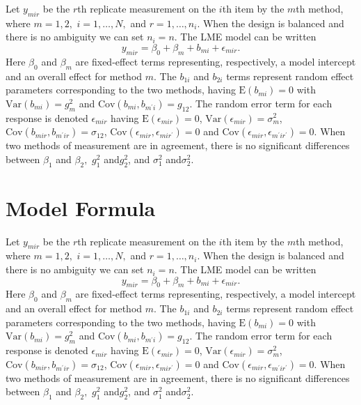 \documentclass[12pt, a4paper]{report}
\theoremstyle{plain}
\theoremstyle{definition}
\theoremstyle{remark}
\begin{document}
Let $y_{mir} $ be the $r$th replicate measurement on the $i$th item by the $m$th method, where $m=1,2,$ $i=1,\ldots,N,$ and $r = 1,\ldots,n_i.$ When the design is balanced and there is no ambiguity we can set $n_i=n.$ The LME model can be written
\begin{equation}
y_{mir} = \beta_{0} + \beta_{m} + b_{mi} + \epsilon_{mir}.
\end{equation}
Here $\beta_0$ and $\beta_m$ are fixed-effect terms representing, respectively, a model intercept and an overall effect for method $m.$ The $b_{1i}$ and $b_{2i}$ terms represent random effect parameters corresponding to the two methods, having $\mathrm{E}(b_{mi})=0$ with $\mathrm{Var}(b_{mi})=g^2_m$ and $\mathrm{Cov}(b_{mi}, b_{m^\prime i})=g_{12}.$ The random error term for each response is denoted $\epsilon_{mir}$ having $\mathrm{E}(\epsilon_{mir})=0$, $\mathrm{Var}(\epsilon_{mir})=\sigma^2_m$, $\mathrm{Cov}(b_{mir}, b_{m^\prime ir})=\sigma_{12}$, $\mathrm{Cov}(\epsilon_{mir}, \epsilon_{mir^\prime})= 0$ and $\mathrm{Cov}(\epsilon_{mir}, \epsilon_{m^\prime ir^\prime})= 0.$
When two methods of measurement are in agreement, there is no significant differences between $\beta_1$ and $\beta_2,$ $g^2_1 $ and$ g^2_2$, and $\sigma^2_1 $ and$ \sigma^2_2$.
\bigskip

\section{Model Formula}
Let $y_{mir} $ be the $r$th replicate measurement on the $i$th item by the $m$th method, where $m=1,2,$ $i=1,\ldots,N,$ and $r = 1,\ldots,n_i.$ When the design is balanced and there is no ambiguity we can set $n_i=n.$ The LME model can be written
\begin{equation}
y_{mir} = \beta_{0} + \beta_{m} + b_{mi} + \epsilon_{mir}.
\end{equation}
Here $\beta_0$ and $\beta_m$ are fixed-effect terms representing, respectively, a model intercept and an overall effect for method $m.$ The $b_{1i}$ and $b_{2i}$ terms represent random effect parameters corresponding to the two methods, having $\mathrm{E}(b_{mi})=0$ with $\mathrm{Var}(b_{mi})=g^2_m$ and $\mathrm{Cov}(b_{mi}, b_{m^\prime i})=g_{12}.$ The random error term for each response is denoted $\epsilon_{mir}$ having $\mathrm{E}(\epsilon_{mir})=0$, $\mathrm{Var}(\epsilon_{mir})=\sigma^2_m$, $\mathrm{Cov}(b_{mir}, b_{m^\prime ir})=\sigma_{12}$, $\mathrm{Cov}(\epsilon_{mir}, \epsilon_{mir^\prime})= 0$ and $\mathrm{Cov}(\epsilon_{mir}, \epsilon_{m^\prime ir^\prime})= 0.$
When two methods of measurement are in agreement, there is no significant differences between $\beta_1$ and $\beta_2,$ $g^2_1 $ and$ g^2_2$, and $\sigma^2_1 $ and$ \sigma^2_2$.
\bigskip
\end{document}
